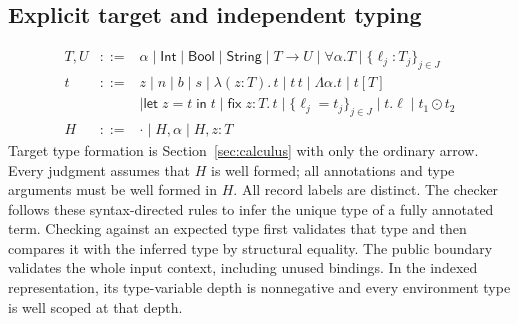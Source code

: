 \documentclass[10pt,a4paper]{article}
\newcommand{\Int}{\mathsf{Int}}
\newcommand{\Str}{\mathsf{String}}
\newcommand{\Bool}{\mathsf{Bool}}
\newcommand{\lam}[3]{\lambda(#1:#2).\,#3}
\newcommand{\fix}[3]{\mathsf{fix}\;#1:#2.\,#3}
\newcommand{\letin}[3]{\mathsf{let}\;#1=#2\;\mathsf{in}\;#3}
\begin{document}
\newpage
\subsection{Explicit target and independent typing}
\label{sec:target}
\[
\begin{array}{rcl}
T,U&::=&\alpha\mid\Int\mid\Bool\mid\Str\mid T\to U\mid\forall\alpha.T\mid\{\ell_j:T_j\}_{j\in J}\\
t&::=&z\mid n\mid b\mid s\mid\lam z T t\mid t\,t\mid\Lambda\alpha.t\mid t[T]\\
&&\mid\letin z t t\mid\fix z T t\mid\{\ell_j=t_j\}_{j\in J}\mid t.\ell
 \mid t_1\mathbin{\odot}t_2\\
H&::=&\cdot\mid H,\alpha\mid H,z:T
\end{array}
\]
Target type formation is Section~\ref{sec:calculus} with only the ordinary arrow. Every judgment assumes
that $H$ is well formed; all annotations and type arguments must be well formed in $H$.
All record labels are distinct. The checker follows these syntax-directed rules to infer
the unique type of a fully annotated term. Checking against an expected type first validates
that type and then compares it with the inferred type by structural equality.
The public boundary validates the whole input context, including unused bindings.
In the indexed representation, its type-variable depth is nonnegative and every environment
type is well scoped at that depth.
\end{document}
